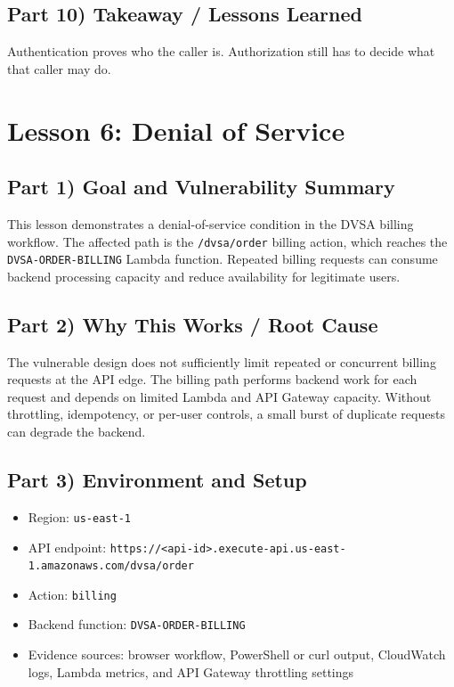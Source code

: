 \documentclass[12pt]{article}
\begin{document}
\subsection*{Part 10) Takeaway / Lessons Learned}
Authentication proves who the caller is. Authorization still has to decide what that caller may do.

\clearpage
\section{Lesson 6: Denial of Service}

\subsection*{Part 1) Goal and Vulnerability Summary}
This lesson demonstrates a denial-of-service condition in the DVSA billing workflow. The affected path is the \texttt{/dvsa/order} billing action, which reaches the \texttt{DVSA-ORDER-BILLING} Lambda function. Repeated billing requests can consume backend processing capacity and reduce availability for legitimate users.

\subsection*{Part 2) Why This Works / Root Cause}
The vulnerable design does not sufficiently limit repeated or concurrent billing requests at the API edge. The billing path performs backend work for each request and depends on limited Lambda and API Gateway capacity. Without throttling, idempotency, or per-user controls, a small burst of duplicate requests can degrade the backend.

\subsection*{Part 3) Environment and Setup}
\begin{itemize}
\item Region: \texttt{us-east-1}
\item API endpoint: \texttt{https://<api-id>.execute-api.us-east-1.amazonaws.com/dvsa/order}
\item Action: \texttt{billing}
\item Backend function: \texttt{DVSA-ORDER-BILLING}
\item Evidence sources: browser workflow, PowerShell or curl output, CloudWatch logs, Lambda metrics, and API Gateway throttling settings
\end{itemize}
\end{document}
